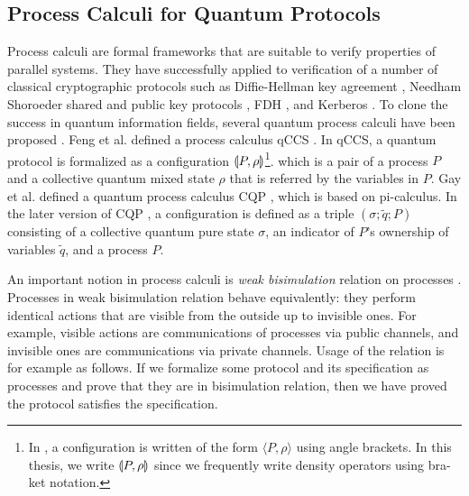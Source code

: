 \subsection{Process Calculi for Quantum Protocols}
Process calculi \cite{Milner1999, AbadiFournet2001, 
Blanchet2008cryptoverif}
are formal frameworks that are
suitable to verify properties of parallel systems.
They have successfully applied to verification of a number of
classical cryptographic protocols such as Diffie-Hellman
key agreement \cite{AbadiFournet2001}, 
Needham Shoroeder shared and public key protocols
\cite{Blanchet2008cryptoverif},
FDH \cite{Blanchet2006FDH}, and Kerberos \cite{Blanchet2008Kerberos}.
To clone the success in quantum information fields,
several quantum process calculi have been proposed
\cite{NagarajanPapanikolaouBowenGay2005, Lalire2006, Adao2007,
FengDuanYing2011}. Feng et al. defined a process calculus qCCS
\cite{FengDuanJiYing2007, Ying2009, FengDuanYing2011, DengFeng2012,
FengDengYing2012}.
In qCCS, a quantum protocol is formalized as a
configuration $\llparenthesis P, \rho \rrparenthesis$\footnote{In \cite{FengDuanJiYing2007,
Ying2009, FengDuanYing2011, DengFeng2012,
FengDengYing2012}, a configuration is written of the form
$\langle P, \rho \rangle$ using angle brackets. In this thesis,
we write $\llparenthesis P, \rho \rrparenthesis$ since we frequently write density operators using
bra-ket notation.}.
which is a pair of a process $P$ and a collective quantum mixed state
$\rho$
that is referred by the variables in $P$.
Gay et al. defined a quantum process calculus CQP
\cite{NagarajanPapanikolaouBowenGay2005, Davidson-etal2012}, which is
based on pi-calculus. In the later version of
CQP \cite{Davidson-etal2012}, a configuration is defined as a triple
$(\sigma;\tilde q;P)$ consisting of a collective
quantum pure state $\sigma$,
an indicator of $P$'s ownership of variables $\tilde q$,
and a process $P$.

An important notion in process calculi is 
{\it weak bisimulation} relation on processes
\cite{Milner1999, AbadiFournet2001}.
Processes in weak bisimulation relation behave equivalently:
they perform identical actions that are
visible from the outside up to invisible ones.
For example, visible actions are communications of processes
via public channels, and invisible ones are 
communications via private channels.
Usage of the relation is for example as follows.
If we formalize some protocol and its 
specification as processes and prove that they 
are in bisimulation relation,
then we have proved the protocol satisfies the specification.

